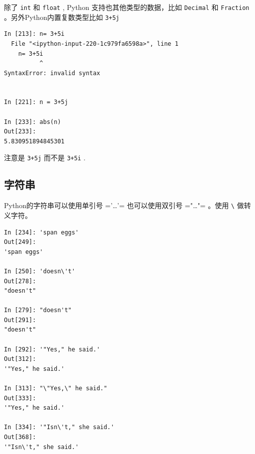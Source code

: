 \documentclass[10pt,a4paper,UTF8]{article}
\begin{document}
除了 \texttt{int} 和 \texttt{float} , Python 支持也其他类型的数据，比如 \texttt{Decimal} 和 \texttt{Fraction} 。另外Python内置复数类型比如 \texttt{3+5j}
\lstset{language=Python,label= ,caption= ,captionpos=b,numbers=none}
\begin{lstlisting}
In [213]: n= 3+5i
  File "<ipython-input-220-1c979fa6598a>", line 1
    n= 3+5i
          ^
SyntaxError: invalid syntax


In [221]: n = 3+5j

In [233]: abs(n)
Out[233]: 
5.830951894845301
\end{lstlisting}
注意是 \texttt{3+5j} 而不是 \texttt{3+5i} .

\subsection{字符串}
\label{sec:orgheadline5}


Python的字符串可以使用单引号 ='\ldots{}'= 也可以使用双引号 ="\ldots{}"= 。使用 \texttt{\textbackslash{}} 做转义字符。
\lstset{language=Python,label= ,caption= ,captionpos=b,numbers=none}
\begin{lstlisting}
In [234]: 'span eggs'
Out[249]: 
'span eggs'

In [250]: 'doesn\'t'
Out[278]: 
"doesn't"

In [279]: "doesn't"
Out[291]: 
"doesn't"

In [292]: '"Yes," he said.'
Out[312]: 
'"Yes," he said.'

In [313]: "\"Yes,\" he said."
Out[333]: 
'"Yes," he said.'

In [334]: '"Isn\'t," she said.'
Out[368]: 
'"Isn\'t," she said.'
\end{lstlisting}
\end{document}
